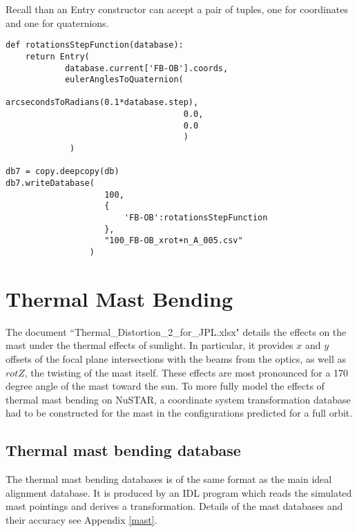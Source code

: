 Recall than an Entry constructor can accept a pair of tuples, one for 
coordinates and one for quaternions. 
\begin{verbatim}
def rotationsStepFunction(database):
    return Entry(
            database.current['FB-OB'].coords,
            eulerAnglesToQuaternion(
                                    arcsecondsToRadians(0.1*database.step),
                                    0.0,
                                    0.0
                                    )
             )

db7 = copy.deepcopy(db)
db7.writeDatabase(
                    100, 
                    {
                        'FB-OB':rotationsStepFunction
                    }, 
                    "100_FB-OB_xrot+n_A_005.csv"
                 )
\end{verbatim}

\section{Thermal Mast Bending}

The document ``Thermal\_Distortion\_2\_for\_JPL.xlsx" details the effects on the mast under the thermal effects of sunlight. In particular, it provides $x$ and $y$ offsets of the focal plane intersections with the beams from the optics, as well as $rotZ$, the twisting of the mast itself. These effects are most pronounced for a 170 degree angle of the mast toward the sun. To more fully model the effects of thermal mast bending on NuSTAR, a coordinate system transformation database had to be constructed for the mast in the configurations predicted for a full orbit. 


\subsection{Thermal mast bending database}
The thermal mast bending databases is of the same format as the main ideal alignment database. It is produced by an IDL program which reads the simulated mast pointings and derives a transformation. Details of the mast databases and their accuracy see Appendix \ref{mast}.

